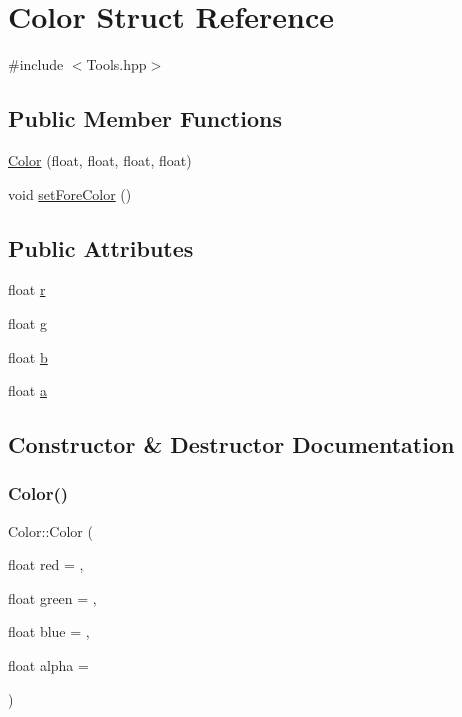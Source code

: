 \hypertarget{struct_color}{}\section{Color Struct Reference}
\label{struct_color}


{\ttfamily \#include $<$Tools.\+hpp$>$}

\subsection*{Public Member Functions}
\begin{DoxyCompactItemize}
\item 
\hyperlink{struct_color_a90c33a7c6af6542e917c8fb136c59bd3}{Color} (float, float, float, float)
\item 
void \hyperlink{struct_color_ab277df545876e66a8094fd5d3dbbcaf2}{set\+Fore\+Color} ()
\end{DoxyCompactItemize}
\subsection*{Public Attributes}
\begin{DoxyCompactItemize}
\item 
float \hyperlink{struct_color_a3958a556b47d2de3dd45c75aac833c20}{r}
\item 
float \hyperlink{struct_color_a5defbb21620e480e556181772d665f34}{g}
\item 
float \hyperlink{struct_color_a33e482be18d6ea31d2b403bee13683b7}{b}
\item 
float \hyperlink{struct_color_a98047aee65fc3d825f88a76da728fd27}{a}
\end{DoxyCompactItemize}


\subsection{Constructor \& Destructor Documentation}
\hypertarget{struct_color_a90c33a7c6af6542e917c8fb136c59bd3}{}\label{struct_color_a90c33a7c6af6542e917c8fb136c59bd3} 
\subsubsection{\texorpdfstring{Color()}{Color()}}
{\footnotesize\ttfamily Color\+::\+Color (\begin{DoxyParamCaption}\item[{float}]{red = {},  }\item[{float}]{green = {},  }\item[{float}]{blue = {},  }\item[{float}]{alpha = {} }\end{DoxyParamCaption})}



